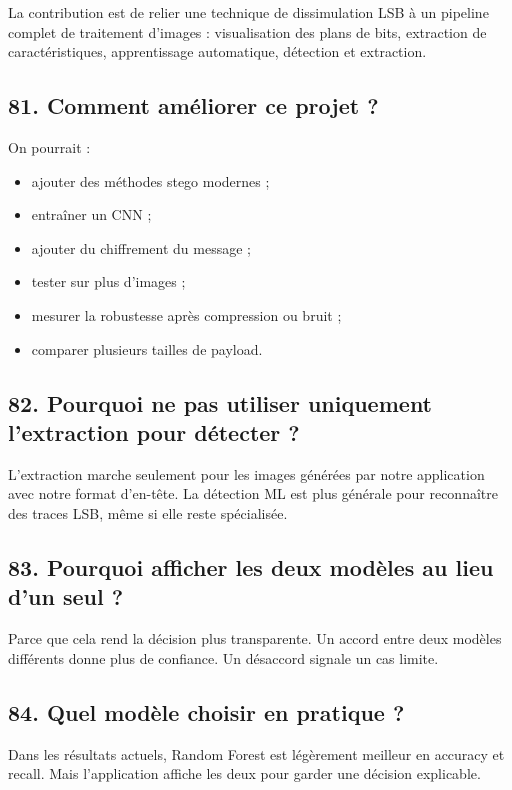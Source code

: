 \documentclass[11pt,a4paper]{article}
\begin{document}
La contribution est de relier une technique de dissimulation LSB à un pipeline complet de traitement d'images : visualisation des plans de bits, extraction de caractéristiques, apprentissage automatique, détection et extraction.

\subsection{81. Comment améliorer ce projet ?}

On pourrait :

\begin{itemize}
\item ajouter des méthodes stego modernes ;
\item entraîner un CNN ;
\item ajouter du chiffrement du message ;
\item tester sur plus d'images ;
\item mesurer la robustesse après compression ou bruit ;
\item comparer plusieurs tailles de payload.
\end{itemize}

\subsection{82. Pourquoi ne pas utiliser uniquement l'extraction pour détecter ?}

L'extraction marche seulement pour les images générées par notre application avec notre format d'en-tête. La détection ML est plus générale pour reconnaître des traces LSB, même si elle reste spécialisée.

\subsection{83. Pourquoi afficher les deux modèles au lieu d'un seul ?}

Parce que cela rend la décision plus transparente. Un accord entre deux modèles différents donne plus de confiance. Un désaccord signale un cas limite.

\subsection{84. Quel modèle choisir en pratique ?}

Dans les résultats actuels, Random Forest est légèrement meilleur en accuracy et recall. Mais l'application affiche les deux pour garder une décision explicable.
\end{document}

